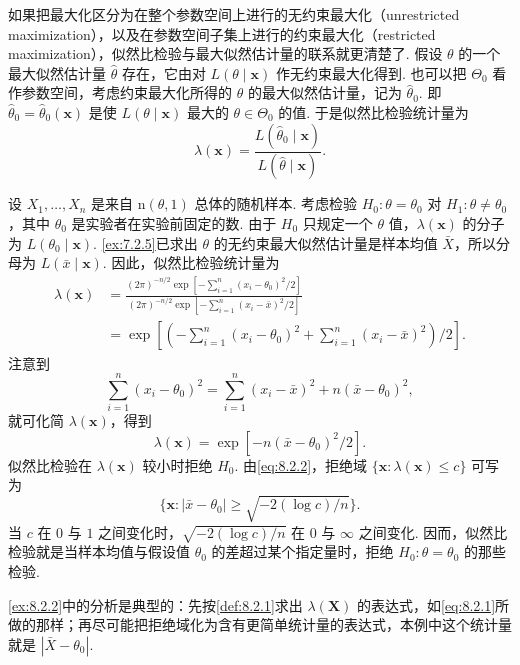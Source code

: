 如果把最大化区分为在整个参数空间上进行的无约束最大化（unrestricted maximization），以及在参数空间子集上进行的约束最大化（restricted maximization），似然比检验与最大似然估计量的联系就更清楚了. 假设 $\theta$ 的一个最大似然估计量 $\hat\theta$ 存在，它由对 $L(\theta\mid\boldsymbol x)$ 作无约束最大化得到. 也可以把 $\Theta_0$ 看作参数空间，考虑约束最大化所得的 $\theta$ 的最大似然估计量，记为 $\hat\theta_0$. 即 $\hat\theta_0=\hat\theta_0(\boldsymbol x)$ 是使 $L(\theta\mid\boldsymbol x)$ 最大的 $\theta\in\Theta_0$ 的值. 于是似然比检验统计量为
$$\lambda(\boldsymbol x)=\frac{L(\hat\theta_0\mid\boldsymbol x)}{L(\hat\theta\mid\boldsymbol x)}.$$
\begin{example}[正态总体的似然比检验]\label{ex:8.2.2}
设 $X_1,\ldots,X_n$ 是来自 $\mathrm n(\theta,1)$ 总体的随机样本. 考虑检验 $H_0:\theta=\theta_0$ 对 $H_1:\theta\ne\theta_0$，其中 $\theta_0$ 是实验者在实验前固定的数. 由于 $H_0$ 只规定一个 $\theta$ 值，$\lambda(\boldsymbol x)$ 的分子为 $L(\theta_0\mid\boldsymbol x)$. \autoref{ex:7.2.5}已求出 $\theta$ 的无约束最大似然估计量是样本均值 $\bar X$，所以分母为 $L(\bar x\mid\boldsymbol x)$. 因此，似然比检验统计量为
\begin{equation}\label{eq:8.2.1}
\begin{aligned}
\lambda(\boldsymbol x)&=\frac{(2\pi)^{-n/2}\exp[-\sum_{i=1}^n(x_i-\theta_0)^2/2]}{(2\pi)^{-n/2}\exp[-\sum_{i=1}^n(x_i-\bar x)^2/2]}\\
&=\exp\left[\left(-\sum_{i=1}^n(x_i-\theta_0)^2+\sum_{i=1}^n(x_i-\bar x)^2\right)/2\right].
\end{aligned}
\end{equation}
注意到
$$\sum_{i=1}^n(x_i-\theta_0)^2=\sum_{i=1}^n(x_i-\bar x)^2+n(\bar x-\theta_0)^2,$$
就可化简 $\lambda(\boldsymbol x)$，得到
\begin{equation}\label{eq:8.2.2}
\lambda(\boldsymbol x)=\exp[-n(\bar x-\theta_0)^2/2].
\end{equation}
似然比检验在 $\lambda(\boldsymbol x)$ 较小时拒绝 $H_0$. 由\eqref{eq:8.2.2}，拒绝域 $\{\boldsymbol x:\lambda(\boldsymbol x)\le c\}$ 可写为
$$\{\boldsymbol x:|\bar x-\theta_0|\ge\sqrt{-2(\log c)/n}\}.$$
当 $c$ 在 $0$ 与 $1$ 之间变化时，$\sqrt{-2(\log c)/n}$ 在 $0$ 与 $\infty$ 之间变化. 因而，似然比检验就是当样本均值与假设值 $\theta_0$ 的差超过某个指定量时，拒绝 $H_0:\theta=\theta_0$ 的那些检验.
\end{example}
\autoref{ex:8.2.2}中的分析是典型的：先按\autoref{def:8.2.1}求出 $\lambda(\boldsymbol X)$ 的表达式，如\eqref{eq:8.2.1}所做的那样；再尽可能把拒绝域化为含有更简单统计量的表达式，本例中这个统计量就是 $|\bar X-\theta_0|$.
